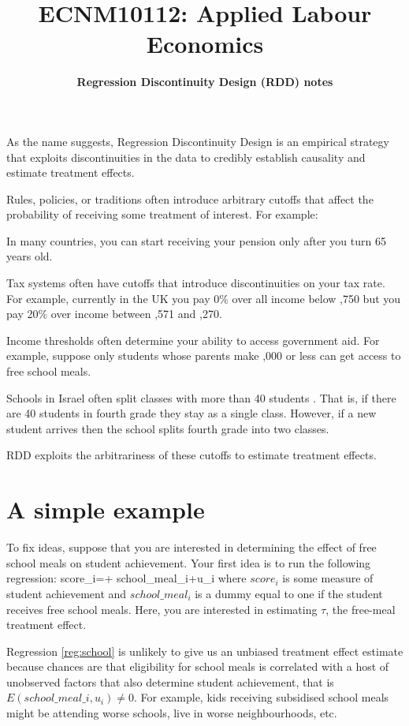 \documentclass[a4paper, 11pt]{article}
\title{\large{\textbf{ECNM10112: Applied Labour Economics}}}
\author{\textbf{Regression Discontinuity Design (RDD) notes}}
\date{}
\begin{document}
	\maketitle
	
	As the name suggests, Regression Discontinuity Design is an empirical strategy that exploits discontinuities in the data to credibly establish causality and estimate treatment effects.
	
	
	Rules, policies, or traditions often introduce arbitrary cutoffs that affect the probability of receiving some treatment of interest. For example:
	\bitem 
		\item In many countries, you can start receiving your pension only after you turn 65 years old.
		\item Tax systems often have cutoffs that introduce discontinuities on your tax rate. For example, currently  in the UK you pay 0\% over all income below ,750 but you pay 20\% over income between ,571 and ,270.
		\item Income thresholds often determine your ability to access government aid. For example, suppose only students whose parents make ,000 or less can get access to free school meals.
		\item Schools in Israel often split classes with more than 40 students \citep{Angrist1999a}. That is, if there are 40 students in fourth grade they stay as a single class. However, if a new student arrives then the school splits fourth grade into two classes.
	\eitem  
	
	RDD exploits the arbitrariness of these cutoffs to estimate treatment effects. 
	
	\section{A simple example}
	
	To fix ideas, suppose that you are interested in determining the effect of free school meals on student achievement. Your first idea is to run the following regression:
	\beqn
		\label{reg:school}
		score_i=\alpha + \tau school\_meal_i+u_i
	\eeqn
	where $score_i$ is some measure of student achievement and $school\_meal_i$ is a dummy equal to one if the student receives free school meals. Here, you are interested in estimating $\tau$, the free-meal treatment effect.
	
	Regression \eqref{reg:school} is unlikely to give us an unbiased treatment effect estimate because chances are that eligibility for school meals is correlated with a host of unobserved factors that also determine student achievement, that is $E( school\_meal\_i,u_i)\neq 0$. For example, kids receiving subsidised school meals might be attending worse schools, live in worse neighbourhoods, etc.
	
\end{document}

